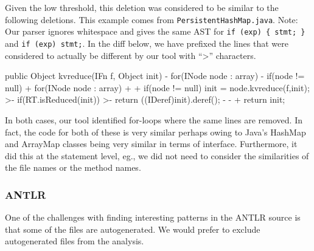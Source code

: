 Given the low threshold, this deletion was considered to be similar to the
following deletions. This example comes from {\tt PersistentHashMap.java}.
Note: Our parser ignores whitespace and gives the same AST for \verb|if (exp) { stmt; }|
and \verb|if (exp) stmt;|. In the diff below, we have prefixed the
lines that were considered to actually be different by our tool with ``>''
characters.

\begin{java}
 public Object kvreduce(IFn f, Object init){
-    for(INode node : array){
-        if(node != null){
+    for(INode node : array)
+        {
+        if(node != null)
             init = node.kvreduce(f,init);
>-                if(RT.isReduced(init))
>-                        return ((IDeref)init).deref();
-               }
-           }
+        }
     return init;
 }
\end{java}

In both cases, our tool identified for-loops where the same lines are removed.
In fact, the code for both of these is very similar perhaps owing to Java's
HashMap and ArrayMap classes being very similar in terms of interface.
Furthermore, it did this at the statement level, eg., we did not need to
consider the similarities of the file names or the method names.

\subsubsection{ANTLR}

One of the challenges with finding interesting patterns in the ANTLR source is
that some of the files are autogenerated. We would prefer to exclude
autogenerated files from the analysis.
